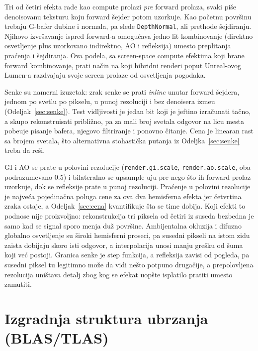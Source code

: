 Tri od \v{c}etiri efekta rade kao compute prolazi \emph{pre} forward prolaza, svaki pi\v{s}e denoisovanu teksturu koju forward \v{s}ejder potom uzorkuje. Kao po\v{c}etnu povr\v{s}inu trebaju G-bafer dubine i normala, pa slede \texttt{DepthNormal}, ali prethode \v{s}ejdiranju. Njihovo izvr\v{s}avanje ispred forward-a omogu\'cava jedno lit kombinovanje (direktno osvetljenje plus uzorkovano indirektno, AO i refleksija) umesto preplitanja pra\'cenja i \v{s}ejdiranja. Ova podela, sa screen-space compute efektima koji hrane forward kombinovanje, prati na\v{c}in na koji hibridni renderi poput Unreal-ovog Lumen-a razdvajaju svoje screen prolaze od osvetljenja pogodaka.

Senke su namerni izuzetak: zrak senke se prati \emph{inline} unutar forward \v{s}ejdera, jednom po svetlu po pikselu, u punoj rezoluciji i bez denoisera izme\dj{}u (Odeljak~\ref{sec:senke}). Test vidljivosti je jedan bit koji je jeftino izra\v{c}unati ta\v{c}no, a skupo rekonstruisati pribli\v{z}no, pa za mali broj svetala odgovor na licu mesta pobe\dj{}uje pisanje bafera, njegovo filtriranje i ponovno \v{c}itanje. Cena je linearan rast sa brojem svetala, \v{s}to alternativna stohasti\v{c}ka putanja iz Odeljka~\ref{sec:senke} treba da re\v{s}i.

GI i AO se prate u polovini rezolucije (\texttt{render.gi.scale}, \texttt{render.ao.scale}, oba podrazumevano 0.5) i bilateralno se upsample-uju pre nego \v{s}to ih forward prolaz uzorkuje, dok se refleksije prate u punoj rezoluciji. Pra\'cenje u polovini rezolucije je najve\'ca pojedina\v{c}na poluga cene za ova dva hemisferna efekta jer \v{c}etvrtina zraka ostaje, a Odeljak~\ref{sec:cena} kvantifikuje \v{s}ta se time dobija. Koji efekti to podnose nije proizvoljno: rekonstrukcija tri piksela od \v{c}etiri iz suseda bezbedna je samo kad se signal sporo menja du\v{z} povr\v{s}ine. Ambijentalna okluzija i difuzno globalno osvetljenje su \v{s}iroki hemisferni proseci, pa susedni pikseli na istom zidu zaista dobijaju skoro isti odgovor, a interpolacija unosi manju gre\v{s}ku od \v{s}uma koji ve\'c postoji. Granica senke je step funkcija, a refleksija zavisi od pogleda, pa susedni piksel tu legitimno mo\v{z}e da vidi ne\v{s}to potpuno druga\v{c}ije, a prepolovljena rezolucija uni\v{s}tava detalj zbog kog se efekat uop\v{s}te isplatilo pratiti umesto zamutiti.

\section{Izgradnja struktura ubrzanja (BLAS/TLAS)}
\label{sec:accel}

